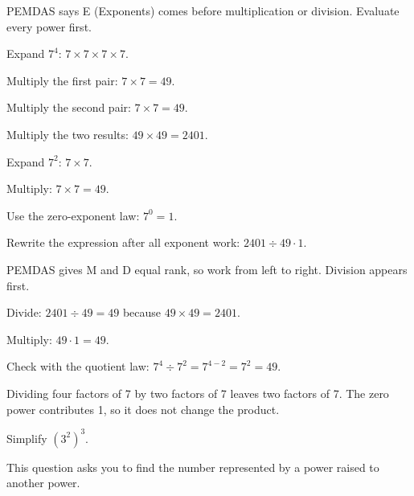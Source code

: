 \begin{steps}
  \item PEMDAS says E (Exponents) comes before multiplication or division.
    Evaluate every power first.
  \item Expand $7^{4}$: $7 \times 7 \times 7 \times 7$.
  \item Multiply the first pair: $7 \times 7 = 49$.
  \item Multiply the second pair: $7 \times 7 = 49$.
  \item Multiply the two results: $49 \times 49 = 2401$.
  \item Expand $7^{2}$: $7 \times 7$.
  \item Multiply: $7 \times 7 = 49$.
  \item Use the zero-exponent law: $7^{0} = 1$.
  \item Rewrite the expression after all exponent work: $2401 \div 49 \cdot 1$.
  \item PEMDAS gives M and D equal rank, so work from left to right. Division
    appears first.
  \item Divide: $2401 \div 49 = 49$ because $49 \times 49 = 2401$.
  \item Multiply: $49 \cdot 1 = 49$.
  \item Check with the quotient law: $7^{4} \div 7^{2} = 7^{4-2} = 7^{2} = 49$.
\end{steps}


Dividing four factors of 7 by two factors of 7 leaves two factors of 7. The zero
power contributes 1, so it does not change the product.


Simplify $(3^{2})^{3}$.


This question asks you to find the number represented by a power raised to
another power.

